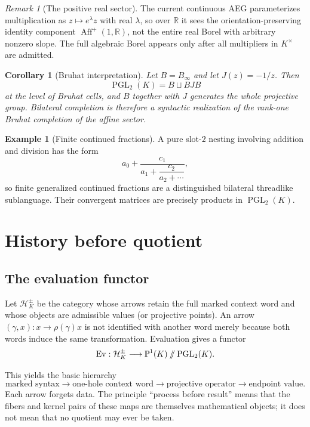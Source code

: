 \documentclass[11pt]{article}
\newtheorem{corollary}[theorem]{Corollary}
\theoremstyle{definition}
\newtheorem{example}[theorem]{Example}
\theoremstyle{remark}
\newtheorem{remark}[theorem]{Remark}
\newcommand{\PGL}{\operatorname{PGL}}
\newcommand{\Aff}{\operatorname{Aff}}
\newcommand{\Ev}{\operatorname{Ev}}
\newcommand{\PP}{\mathbb P}
\newcommand{\cH}{\mathcal H}
\newcommand{\sslash}{\mathbin{/\mkern-6mu/}}
\begin{document}
\begin{remark}[The positive real sector]
The current continuous AEG parameterizes multiplication as
\(z\mapsto e^\lambda z\) with real \(\lambda\), so over \(\mathbb R\) it sees
the orientation-preserving identity component \(\Aff^+(1,\mathbb R)\), not
the entire real Borel with arbitrary nonzero slope.  The full algebraic Borel
appears only after all multipliers in \(K^\times\) are admitted.
\end{remark}

\begin{corollary}[Bruhat interpretation]
Let \(B=B_\infty\) and let \(J(z)=-1/z\).  Then
\[
\PGL_2(K)=B\sqcup BJB
\]
at the level of Bruhat cells, and \(B\) together with \(J\) generates the
whole projective group.  Bilateral completion is therefore a syntactic
realization of the rank-one Bruhat completion of the affine sector.
\end{corollary}

\begin{example}[Finite continued fractions]
A pure slot-\(2\) nesting involving addition and division has the form
\[
a_0+\frac{c_1}{a_1+\dfrac{c_2}{a_2+\cdots}},
\]
so finite generalized continued fractions are a distinguished bilateral
threadlike sublanguage.  Their convergent matrices are precisely products in
\(\PGL_2(K)\).
\end{example}

\section{History before quotient}

\subsection{The evaluation functor}

Let \(\cH_K^\pm\) be the category whose arrows retain the full marked context
word and whose objects are admissible values (or projective points).  An arrow
\((\gamma,x):x\to\rho(\gamma)x\) is not identified with another word merely
because both words induce the same transformation.  Evaluation gives a
functor
\[
\Ev:\cH_K^\pm\longrightarrow \PP^1(K)\sslash\PGL_2(K).
\]

This yields the basic hierarchy
\begin{equation}
\text{marked syntax}
\longrightarrow
\text{one-hole context word}
\longrightarrow
\text{projective operator}
\longrightarrow
\text{endpoint value}.
\label{eq:forgetful-syntax-tower}
\end{equation}
Each arrow forgets data.  The principle ``process before result'' means that
the fibers and kernel pairs of these maps are themselves mathematical objects;
it does not mean that no quotient may ever be taken.
\end{document}
